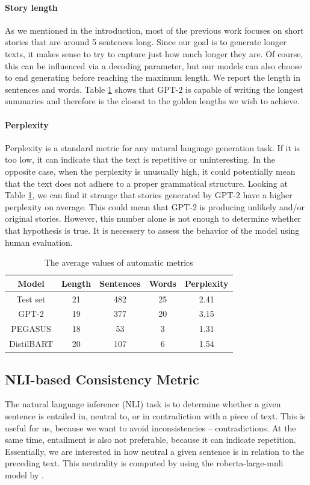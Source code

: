 \documentclass[11pt,a4paper]{article}
\begin{document}
\paragraph{Story length}
As we mentioned in the introduction, most of the previous work focuses on short stories that are around 5 sentences long. Since our goal is to generate longer texts, it makes sense to try to capture just how much longer they are. Of course, this can be influenced via a decoding parameter, but our models can also choose to end generating before reaching the maximum length. We report the length in sentences and words. Table \ref{tab:automatic} shows that GPT-2 is capable of writing the longest summaries and therefore is the closest to the golden lengths we wish to achieve.

\paragraph{Perplexity}
Perplexity is a standard metric for any natural language generation task. If it is too low, it can indicate that the text is repetitive or uninteresting. In the opposite case, when the perplexity is unusually high, it could potentially mean that the text does not adhere to a proper grammatical structure. Looking at Table \ref{tab:automatic}, we can find it strange that stories generated by GPT-2 have a higher perplexity on average. This could mean that GPT-2 is producing unlikely and/or original stories. However, this number alone is not enough to determine whether that hypothesis is true. It is necessery to assess the behavior of the model using human evaluation.


\begin{table}[]
    \centering
    \begin{tabular}{|c|c|c|c|c|}
    \hline
    \textbf{Model}  & \textbf{Length} & \textbf{Sentences} & \textbf{Words} & \textbf{Perplexity} \\\hline
    Test set & 21  & 482 & 25 & 2.41 \\
    GPT-2 & 19 & 377 & 20 & 3.15 \\
    PEGASUS & 18 & 53 & 3 & 1.31 \\
    DistilBART & 20 & 107 & 6 & 1.54 \\
    \hline
    \end{tabular}
    \caption{The average values of automatic metrics}
    \label{tab:automatic}
\end{table}

\subsection{NLI-based Consistency Metric}
\label{sec:nli}
The natural language inference (NLI) task is to determine whether a given sentence is entailed in, neutral to, or in contradiction with a piece of text.
This is useful for us, because we want to avoid inconsistencies -- contradictions.
At the same time, entailment is also not preferable, because it can indicate repetition.
Essentially, we are interested in how neutral a given sentence is in relation to the preceding text.
This neutrality is computed by using the roberta-large-mnli model by \cite{liu2019roberta}.
\end{document}
